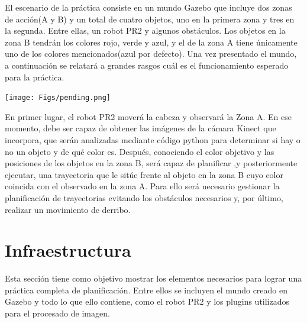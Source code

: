 \documentclass[12pt,spanish,chapterprefix, numbers=noenddot]{book}
\numberwithin{equation}{section}
\numberwithin{figure}{section}
\begin{document}
El escenario de la práctica consiste en un mundo Gazebo que incluye dos zonas de acción(A y B) y un total de cuatro objetos, uno en la primera zona y tres en la segunda. Entre ellas, un robot PR2 y algunos obstáculos. Los objetos en la zona B tendrán los colores rojo, verde y azul, y el de la zona A tiene únicamente uno de los colores mencionados(azul por defecto). Una vez presentado el mundo, a continuación se relatará a grandes rasgos cuál es el funcionamiento esperado para la práctica. 
\begin{center}
\texttt{[image: Figs/pending.png]}
\end{center}
En primer lugar,  el robot PR2 moverá la cabeza y observará la Zona A. En ese momento, debe ser capaz de obtener las imágenes de la cámara Kinect que incorpora, que serán analizadas mediante código python para determinar si hay o no un objeto y de qué color es. 
Después, conociendo el color objetivo y las posiciones de los objetos en la zona B, será capaz de planificar ,y posteriormente ejecutar, una trayectoria que le sitúe frente al objeto en la zona B cuyo color coincida con el observado en la zona A. Para ello será necesario gestionar la planificación de trayectorias evitando los obstáculos necesarios y, por último, realizar un movimiento de derribo.

\section{Infraestructura}
Esta sección tiene como objetivo mostrar los elementos necesarios para lograr una práctica completa de planificación. Entre ellos se incluyen el mundo creado en Gazebo y todo lo que ello contiene, como el robot PR2 y los plugins utilizados para el procesado de imagen.  
\end{document}
